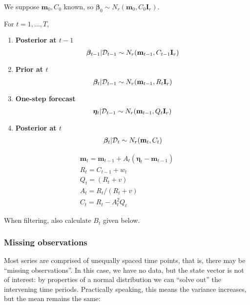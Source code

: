 \documentclass{article}
\begin{document}
We suppose $\mathbf{m}_{0},C_{0}$ known, so $\bm\beta_{0}\sim
N_{r}(\mathbf{m}_{0},C_{0}\mathbf{I}_{r})$.

For $t=1,\dots,T$,

\begin{enumerate}
\item \textbf{Posterior at $t-1$}
  \begin{gather}
  \bm\beta_{t-1}|{\cal D}_{t-1} \sim N_{r}(\mathbf{m}_{t-1}, C_{t-1}\mathbf{I}_{r})
\end{gather}

\item \textbf{Prior at $t$}
  \begin{gather}
  \bm\beta_{t}|{\cal D}_{t-1} \sim N_{r}(\mathbf{m}_{t-1},
  R_{t}\mathbf{I}_{r})
\end{gather}

\item \textbf{One-step forecast}
  \begin{gather}
    \bm\eta_{t} | {\cal D}_{t-1} \sim N_{r}(\mathbf{m}_{t-1}, Q_{t}
    \mathbf{I}_{r})
\end{gather}
\item \textbf{Posterior at $t$}
  \begin{gather} \bm\beta_{t}|{\cal D}_{t} \sim N_{r}(\mathbf{m}_{t}, C_{t}) \end{gather}
\end{enumerate}

\begin{gather}
  \mathbf{m}_{t} = \mathbf{m}_{t-1} + A_{t} (\bm\eta_{t} -
  \mathbf{m}_{t-1}) \\
  R_{t} = C_{t-1} + w_{t} \\
  Q_{t} = (R_{t} + v) \\
  A_{t} = R_{t} / (R_{t} + v) \\
  C_{t} = R_{t} - A_{t}^{2}Q_{t}
\end{gather}

When filtering, also calculate $B_{t}$ given below.

\subsubsection{Missing observations}

Most series are comprised of unequally spaced time points, that is,
there may be ``missing observations''. In this case, we
have no data, but the state vector is not of interest: by properties
of a normal distribution  we can ``solve out'' the intervening time
periods. Practically speaking, this means the variance increases, but
the mean remains the same:
\end{document}
